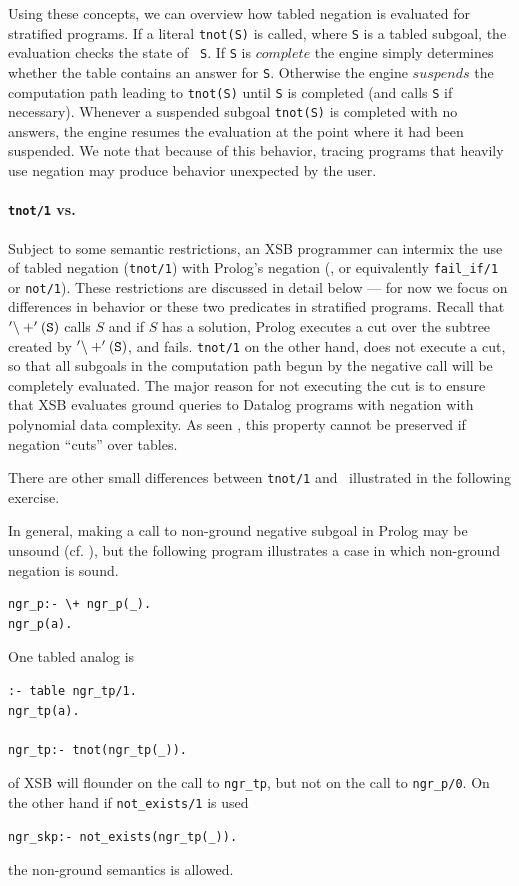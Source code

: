 Using these concepts, we can overview how tabled negation is evaluated
for stratified programs.  If a literal {\tt tnot(S)} is called, where
{\tt S} is a tabled subgoal, the evaluation checks the state of {\tt
S}.  If {\tt S} is $complete$ the engine simply determines whether the
table contains an answer for {\tt S}.  Otherwise the engine $suspends$
the computation path leading to {\tt tnot(S)} until {\tt S} is
completed (and calls {\tt S} if necessary).  Whenever a suspended
subgoal {\tt tnot(S)} is completed with no answers, the engine resumes
the evaluation at the point where it had been suspended.  We note that
because of this behavior, tracing programs that heavily use negation
may produce behavior unexpected by the user.



\paragraph*{{\tt tnot/1} vs. \not }
Subject to some semantic restrictions, an XSB programmer can intermix
the use of tabled negation ({\tt tnot/1}) with Prolog's negation
(\not, or equivalently {\tt fail\_if/1} or {\tt not/1}).  These
restrictions are discussed in detail below --- for now we focus on
differences in behavior or these two predicates in stratified
programs.  Recall that ${\tt '\backslash+'(S)}$ calls $S$ and if $S$
has a solution, Prolog executes a cut over the subtree created by
${\tt '\backslash+'(S)}$, and fails.  {\tt tnot/1} on the other hand,
does not execute a cut, so that all subgoals in the computation path
begun by the negative call will be completely evaluated.  The major
reason for not executing the cut is to ensure that XSB evaluates
ground queries to Datalog programs with negation with polynomial data
complexity.  As seen \cite{ChWa96}, this property cannot be preserved
if negation ``cuts'' over tables.

There are other small differences between {\tt tnot/1} and \not 
\ illustrated in the following exercise.

\begin{exercise}
In general, making a call to non-ground negative subgoal in Prolog may
be unsound (cf. \cite{Lloy84}), but the following program illustrates
a case in which non-ground negation is sound.
\begin{verbatim}
ngr_p:- \+ ngr_p(_).
ngr_p(a).
\end{verbatim}
One tabled analog is 
\begin{verbatim}
:- table ngr_tp/1.
ngr_tp(a).

ngr_tp:- tnot(ngr_tp(_)).
\end{verbatim}
\version{} of XSB will flounder on the call to {\tt ngr\_tp}, but not
on the call to {\tt ngr\_p/0}.  On the other hand if {\tt not\_exists/1}
is used
\begin{verbatim}
ngr_skp:- not_exists(ngr_tp(_)).
\end{verbatim}
the non-ground semantics is allowed.  
\end{exercise}

